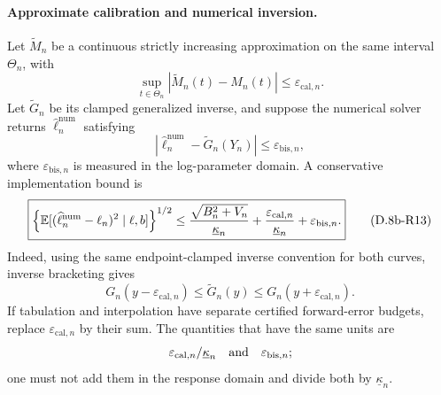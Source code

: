 \paragraph{Approximate calibration and numerical inversion.}
Let $\widetilde M_n$ be a continuous strictly increasing approximation
on the same interval
$\Theta_n$, with
\[
 \sup_{t\in\Theta_n}|\widetilde M_n(t)-M_n(t)|
 \le\varepsilon_{\mathrm{cal},n}.
\]
Let $\widetilde G_n$ be its clamped generalized inverse, and suppose
the numerical solver returns $\widehat\ell_n^{\mathrm{num}}$ satisfying
\[
 |\widehat\ell_n^{\mathrm{num}}-\widetilde G_n(Y_n)|
 \le\varepsilon_{\mathrm{bis},n},
\]
where $\varepsilon_{\mathrm{bis},n}$ is measured in the log-parameter
domain.  A conservative implementation bound is
\begin{equation}
 \boxed{
 \left\{\mathbb E[(\widehat\ell_n^{\mathrm{num}}-\ell_n)^2
                    \mid\ell,b]\right\}^{1/2}
 \le {\sqrt{B_n^2+V_n}\over\underline\kappa_n}
 +{\varepsilon_{\mathrm{cal},n}\over\underline\kappa_n}
 +\varepsilon_{\mathrm{bis},n}.}
 \tag{D.8b-R13}
\end{equation}
Indeed, using the same endpoint-clamped inverse convention for both
curves, inverse bracketing gives
\[
 G_n(y-\varepsilon_{\mathrm{cal},n})
 \le\widetilde G_n(y)
 \le G_n(y+\varepsilon_{\mathrm{cal},n}).
\]
If tabulation and interpolation have separate certified forward-error
budgets, replace $\varepsilon_{\mathrm{cal},n}$ by their sum.  The
quantities that have the same units are
\[
 \varepsilon_{\mathrm{cal},n}/\underline\kappa_n
 \quad\hbox{and}\quad \varepsilon_{\mathrm{bis},n};
\]
one must not add them in the response domain and divide both by
$\underline\kappa_n$.

